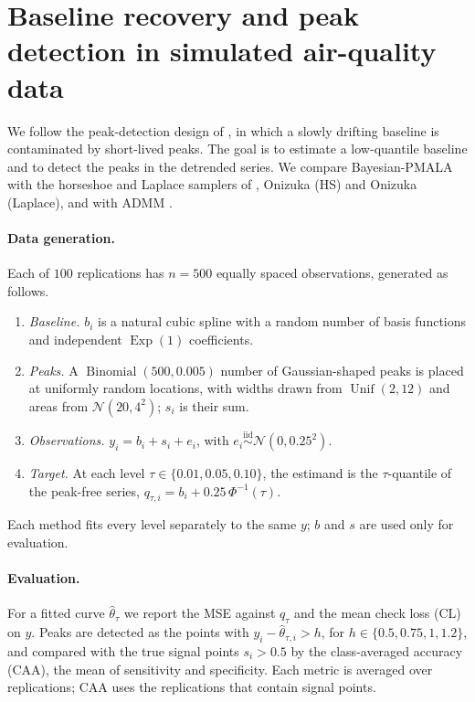 \clearpage
\section{Baseline recovery and peak detection in simulated air-quality data}
\label{sec:air_simulation}

We follow the peak-detection design of \citet[Section~4.2]{brantley2020baseline}, in which a slowly drifting baseline is contaminated by short-lived peaks. The goal is to estimate a low-quantile baseline and to detect the peaks in the detrended series. We compare Bayesian-PMALA with the horseshoe and Laplace samplers of \citet{onizuka2024fast}, Onizuka (HS) and Onizuka (Laplace), and with ADMM \citep{brantley2020baseline}.

\paragraph{Data generation.} Each of $100$ replications has $n=500$ equally spaced observations, generated as follows.
\begin{enumerate}
 \item \emph{Baseline.} $b_i$ is a natural cubic spline with a random number of basis functions and independent $\operatorname{Exp}(1)$ coefficients.
 \item \emph{Peaks.} A $\operatorname{Binomial}(500,0.005)$ number of Gaussian-shaped peaks is placed at uniformly random locations, with widths drawn from $\operatorname{Unif}(2,12)$ and areas from $\mathcal{N}(20,4^2)$; $s_i$ is their sum.
 \item \emph{Observations.} $y_i=b_i+s_i+e_i$, with $e_i\stackrel{\mathrm{iid}}{\sim}\mathcal{N}(0,0.25^2)$.
 \item \emph{Target.} At each level $\tau\in\{0.01,0.05,0.10\}$, the estimand is the $\tau$-quantile of the peak-free series, $q_{\tau,i}=b_i+0.25\,\Phi^{-1}(\tau)$.
\end{enumerate}
Each method fits every level separately to the same $y$; $b$ and $s$ are used only for evaluation.

\paragraph{Evaluation.} For a fitted curve $\widehat\theta_\tau$ we report the MSE against $q_\tau$ and the mean check loss (CL) on $y$. Peaks are detected as the points with $y_i-\widehat\theta_{\tau,i}>h$, for $h\in\{0.5,0.75,1,1.2\}$, and compared with the true signal points $s_i>0.5$ by the class-averaged accuracy (CAA), the mean of sensitivity and specificity. Each metric is averaged over replications; CAA uses the replications that contain signal points.

